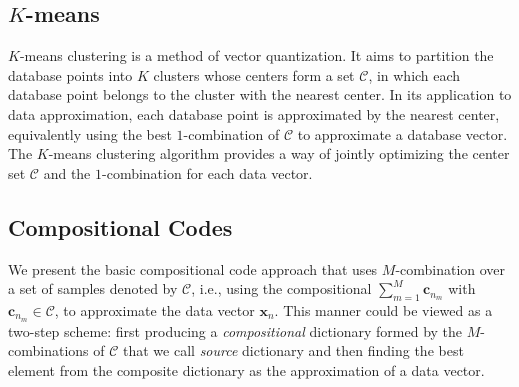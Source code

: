 \documentclass[10pt, letterpaper]{article}
\begin{document}
\subsection{$K$-means}
$K$-means clustering is a method of vector quantization.
It aims to partition the database points
into $K$ clusters
whose centers form a set $\mathcal{C}$,
in which each database point belongs to the cluster with the nearest center.
In its application to data approximation,
each database point is approximated
by the nearest center,
equivalently using the best $1$-combination
of $\mathcal{C}$
to approximate a database vector.
The $K$-means clustering algorithm
provides a way of jointly optimizing the center set
$\mathcal{C}$ and the $1$-combination for each data vector.




\subsection{Compositional Codes}\label{subsection:OurApproachCompositionalCodes}
We present the basic compositional code approach
that uses $M$-combination over a set of samples
denoted by $\mathcal{C}$,
i.e., using the compositional $\sum_{m=1}^M \mathbf{c}_{n_m}$
with $\mathbf{c}_{n_m} \in \mathcal{C}$,
to approximate the data vector $\mathbf{x}_n$.
This manner could be viewed as a two-step scheme:
first producing a \emph{compositional} dictionary
formed by the $M$-combinations of
$\mathcal{C}$ that we call \emph{source} dictionary
and then finding the best element from the composite dictionary
as the approximation of a data vector.
\end{document}
